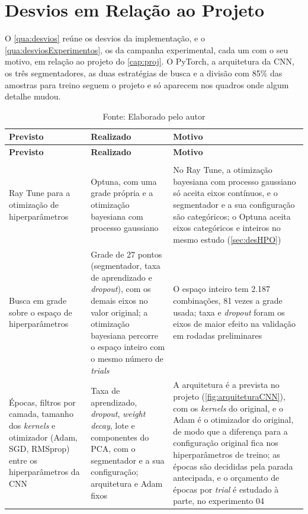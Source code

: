 \chapter{Desvios em Relação ao Projeto}
\label{ap:desvios}

O \autoref{qua:desvios} reúne os desvios da implementação, e o \autoref{qua:desviosExperimentos}, os da campanha experimental, cada um com o seu motivo, em relação ao projeto do \autoref{cap:proj}. O PyTorch, a arquitetura da CNN, os três segmentadores, as duas estratégias de busca e a divisão com 85\% das amostras para treino seguem o projeto e só aparecem nos quadros onde algum detalhe mudou.

\begingroup
\small
\renewcommand{\LTcaptype}{quadro}
\begin{longtable}{|>{\RaggedRight\arraybackslash}p{}|>{\RaggedRight\arraybackslash}p{}|>{\RaggedRight\arraybackslash}p{}|}
    \caption{Desvios em relação ao projeto: implementação}
    \label{qua:desvios} \\
        \hline
        \rowcolor[HTML]{C0C0C0}
        \textbf{Previsto} & \textbf{Realizado} & \textbf{Motivo} \\
        \hline
    \endfirsthead
        \hline
        \rowcolor[HTML]{C0C0C0}
        \textbf{Previsto} & \textbf{Realizado} & \textbf{Motivo} \\
        \hline
    \endhead
    \caption*{Fonte: Elaborado pelo autor} \\
    \endlastfoot
        Ray Tune para a otimização de hiperparâmetros & Optuna, com uma grade própria e a otimização bayesiana com processo gaussiano & No Ray Tune, a otimização bayesiana com processo gaussiano só aceita eixos contínuos, e o segmentador e a sua configuração são categóricos; o Optuna aceita eixos categóricos e inteiros no mesmo estudo (\autoref{sec:desHPO}) \\
        \hline
        Busca em grade sobre o espaço de hiperparâmetros & Grade de 27 pontos (segmentador, taxa de aprendizado e \textit{dropout}), com os demais eixos no valor original; a otimização bayesiana percorre o espaço inteiro com o mesmo número de \textit{trials} & O espaço inteiro tem 2.187 combinações, 81 vezes a grade usada; taxa e \textit{dropout} foram os eixos de maior efeito na validação em rodadas preliminares \\
        \hline
        Épocas, filtros por camada, tamanho dos \textit{kernels} e otimizador (Adam, SGD, RMSprop) entre os hiperparâmetros da CNN & Taxa de aprendizado, \textit{dropout}, \textit{weight decay}, lote e componentes do PCA, com o segmentador e a sua configuração; arquitetura e Adam fixos & A arquitetura é a prevista no projeto (\autoref{fig:arquiteturaCNN}), com os \textit{kernels} do original, e o Adam é o otimizador do original, de modo que a diferença para a configuração original fica nos hiperparâmetros de treino; as épocas são decididas pela parada antecipada, e o orçamento de épocas por \textit{trial} é estudado à parte, no experimento 04 \\

\end{longtable}
